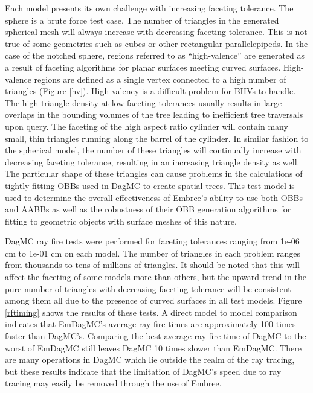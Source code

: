 \documentclass{anstrans}
\begin{document}
Each model presents its own challenge with increasing faceting tolerance. The sphere is a brute force test case. The number of triangles in the generated spherical mesh will always increase with decreasing faceting tolerance. This is not true of some geometries such as cubes or other rectangular parallelepipeds. In the case of the notched sphere, regions referred to as ``high-valence'' are generated as a result of faceting algorithms for planar surfaces meeting curved surfaces. High-valence regions are defined as a single vertex connected to a high number of triangles (Figure \ref{hv}). High-valency is a difficult problem for BHVs to handle. The high triangle density at low faceting tolerances usually results in large overlaps in the bounding volumes of the tree leading to inefficient tree traversals upon query. The faceting of the high aspect ratio cylinder will contain many small, thin triangles running along the barrel of the cylinder. In similar fashion to the spherical model, the number of these triangles will continually increase with decreasing faceting tolerance, resulting in an increasing triangle density as well. The particular shape of these triangles can cause problems in the calculations of tightly fitting OBBs used in DagMC to create spatial trees. This test model is used to determine the overall effectiveness of Embree's ability to use both OBBs and AABBs as well as the robustness of their OBB generation algorithms for fitting to geometric objects with surface meshes of this nature.

DagMC ray fire tests were performed for faceting tolerances ranging from 1e-06 cm to 1e-01 cm on each model. The number of triangles in each problem ranges from thousands to tens of millions of triangles. It should be noted that this will affect the faceting of some models more than others, but the upward trend in the pure number of triangles with decreasing faceting tolerance will be consistent among them all due to the presence of curved surfaces in all test models. Figure \ref{rftiming} shows the results of these tests. A direct model to model comparison indicates that EmDagMC's average ray fire times are approximately 100 times faster than DagMC's. Comparing the best average ray fire time of DagMC to the worst of EmDagMC still leaves DagMC 10 times slower than EmDagMC. There are many operations in DagMC which lie outside the realm of the ray tracing, but these results indicate that the limitation of DagMC's speed due to ray tracing may easily be removed through the use of Embree.
\end{document}
